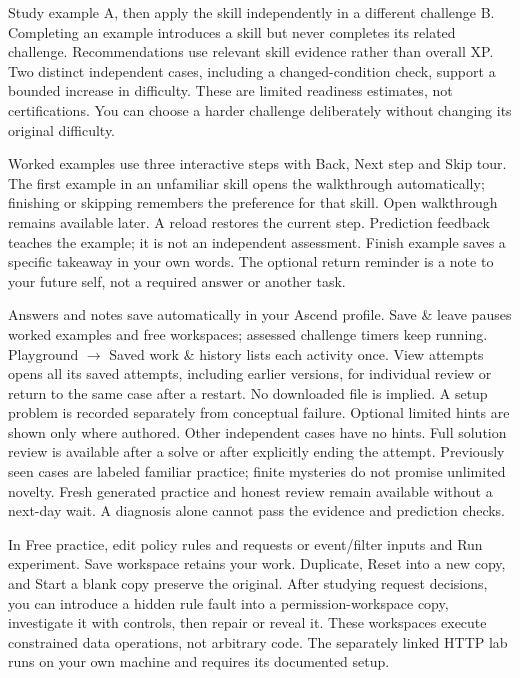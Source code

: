Study example A, then apply the skill independently in a different challenge B.
Completing an example introduces a skill but never completes its related challenge.
Recommendations use relevant skill evidence rather than overall XP. Two distinct
independent cases, including a changed-condition check, support a bounded increase
in difficulty. These are limited readiness estimates, not certifications. You can
choose a harder challenge deliberately without changing its original difficulty.

Worked examples use three interactive steps with Back, Next step and Skip tour.
The first example in an unfamiliar skill opens the walkthrough automatically;
finishing or skipping remembers the preference for that skill. Open walkthrough
remains available later. A reload restores the current step. Prediction feedback
teaches the example; it is not an independent assessment. Finish example saves a
specific takeaway in your own words. The optional return reminder is a note to
your future self, not a required answer or another task.

Answers and notes save automatically in your Ascend profile. Save \& leave pauses
worked examples and free workspaces; assessed challenge timers keep running.
Playground $\rightarrow$ Saved work \& history lists each activity once. View
attempts opens all its saved attempts, including earlier versions, for individual
review or return to the same case after a restart. No downloaded file is implied. A setup problem is
recorded separately from conceptual failure. Optional limited hints are shown only
where authored. Other independent cases have no hints. Full solution review is
available after a solve or after explicitly ending the attempt. Previously seen
cases are labeled familiar practice; finite mysteries do not promise unlimited
novelty. Fresh generated practice and honest review remain available without a
next-day wait. A diagnosis alone cannot pass the evidence and prediction checks.

In Free practice, edit policy rules and requests or event/filter inputs and Run
experiment. Save workspace retains your work. Duplicate, Reset into a new copy,
and Start a blank copy preserve the original. After studying request decisions,
you can introduce a hidden rule fault into a permission-workspace copy, investigate
it with controls, then repair or reveal it. These workspaces execute constrained
data operations, not arbitrary code. The separately linked HTTP lab runs on your
own machine and requires its documented setup.

